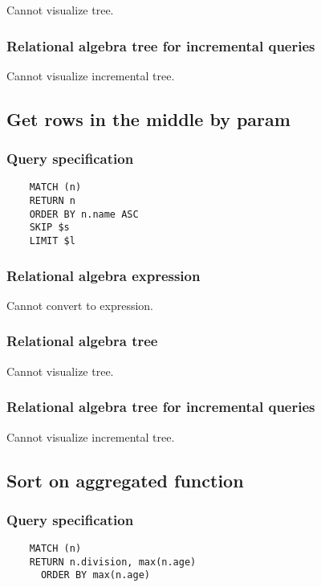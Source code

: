 	Cannot visualize tree.

	\subsubsection*{Relational algebra tree for incremental queries}

	Cannot visualize incremental tree.
	\subsection{Get rows in the middle by param}

	\subsubsection*{Query specification}

	\begin{lstlisting}
	MATCH (n)
	RETURN n
	ORDER BY n.name ASC
	SKIP $s
	LIMIT $l
	\end{lstlisting}


	\subsubsection*{Relational algebra expression}

	Cannot convert to expression.

	\subsubsection*{Relational algebra tree}

	Cannot visualize tree.

	\subsubsection*{Relational algebra tree for incremental queries}

	Cannot visualize incremental tree.
	\subsection{Sort on aggregated function}

	\subsubsection*{Query specification}

	\begin{lstlisting}
	MATCH (n)
	RETURN n.division, max(n.age)
	  ORDER BY max(n.age)
	\end{lstlisting}



